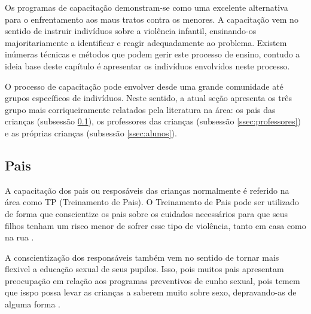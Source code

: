 
Os programas de capacitação demonstram-se como uma excelente alternativa para o enfrentamento aos maus tratos contra os menores. A capacitação vem no sentido de instruir indivíduos sobre a violência infantil, ensinando-os majoritariamente a identificar e reagir adequadamente ao problema. Existem inúmeras técnicas e métodos que podem gerir este processo de ensino, contudo a ideia base deste capítulo é apresentar os indivíduos envolvidos neste processo. 

O processo de capacitação pode envolver desde uma grande comunidade até grupos específicos de indivíduos. Neste sentido, a atual seção apresenta os três grupo mais corriqueiramente relatados pela literatura na área: os pais das crianças (subsessão \ref{ssec:pais}), os professores das crianças (subsessão \ref{ssec:professores}) e as próprias crianças (subsessão \ref{ssec:alunos}).

\subsection{Pais}\label{ssec:pais}

A capacitação dos pais ou resposáveis das crianças normalmente é referido na área como TP (Treinamento de Pais). O Treinamento de Pais pode ser utilizado de forma que conscientize os pais sobre os cuidados necessários para que seus filhos tenham um risco menor de sofrer esse tipo de violência, tanto em casa como na rua \cite{pelisoli2010prevenccao}. 

A conscientização dos responsáveis também vem no sentido de tornar mais flexivel a educação sexual de seus pupilos. Isso, pois muitos pais apresentam preocupação em relação aos programas preventivos de cunho sexual, pois temem que isspo possa levar as crianças a saberem muito sobre sexo, depravando-as de alguma forma \cite{chen2007prevention}. 




